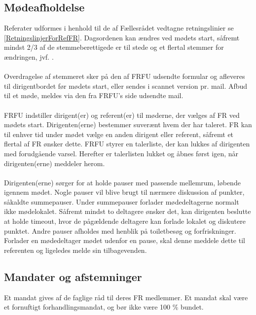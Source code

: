 \subsection{Mødeafholdelse}
Referater udformes i henhold til de af Fællesrådet vedtagne retningslinier se \ref{RetningslinjerForRefFR}. Dagsordenen kan ændres ved mødets start, såfremt mindst 2/3 af de stemmeberettigede er til stede og et flertal stemmer for ændringen, jvf. .\\
\\
Overdragelse af stemmeret sker på den af FRFU udsendte formular og afleveres til dirigentbordet før mødets start, eller sendes i scannet version pr. mail. Afbud til et møde, meldes via den fra FRFU’s side udsendte mail.\\
\\
FRFU indstiller dirigent(er) og referent(er) til møderne, der vælges af FR ved mødets start. Dirigenten(erne) bestemmer
suverænt hvem der har taleret. FR kan til enhver tid under mødet vælge en anden dirigent eller referent, såfremt et
flertal af FR ønsker dette. FRFU styrer en talerliste, der kan lukkes af dirigenten med forudgående varsel. Herefter er
talerlisten lukket og åbnes først igen, når dirigenten(erne) meddeler herom.\\
\\
Dirigenten(erne) sørger for at holde pauser med passende mellemrum, løbende igennem mødet. Nogle pauser vil blive
brugt til nærmere diskussion af punkter, såkaldte summepauser. Under summepauser forlader mødedeltagerne normalt
ikke mødelokalet. Såfremt mindst to deltagere ønsker det, kan dirigenten beslutte at holde timeout, hvor de pågældende
deltagere kan forlade lokalet og diskutere punktet. Andre pauser afholdes med henblik på toiletbesøg og forfriskninger.
Forlader en mødedeltager mødet udenfor en pause, skal denne meddele dette til referenten og ligeledes melde sin
tilbagevenden.\\

\subsection{Mandater og afstemninger}
Et mandat gives af de faglige råd til deres FR medlemmer. Et mandat skal være et fornuftigt forhandlingsmandat, og bør
ikke være 100 \% bundet.\\

